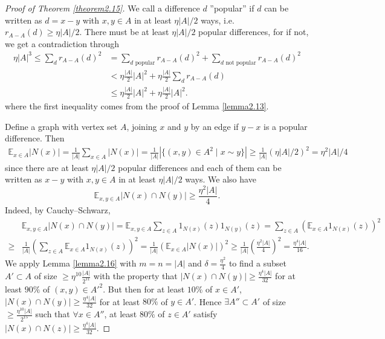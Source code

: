 \documentclass{article}
\theoremstyle{definition}
\begin{document}
\begin{proof}[Proof of Theorem \ref{theorem2.15}]
    We call a difference $d$ ''popular'' if $d$ can be written as $d = x-y$ with $x,y \in A$ in at least $\eta \left|A\right|/2$ ways, i.e. $r_{A-A}(d)\ge \eta\left|A\right|/2$. There must be at least $\eta \left|A\right|/2$ popular differences, for if not, we get a contradiction through
    \begin{align*}
        \eta \left|A\right|^3 \le \sum_{d}^{} r_{A-A}(d)^2 &= \sum_{d \text{ popular}}^{} r_{A-A}(d)^2 + \sum_{d \text{ not popular}}^{} r_{A-A}(d)^2 \\
        &< \eta \frac{\left|A\right|}{2}\left|A\right|^2 + \eta \frac{\left|A\right|}{2}\sum_{d }^{} r_{A-A}(d) \\
        &\le \eta \frac{\left|A\right|}{2}\left|A\right|^2 + \eta \frac{\left|A\right|}{2}\left|A\right|^2.
    \end{align*}
    where the first inequality comes from the proof of Lemma \ref{lemma2.13}.
    \vspace{1mm}
     
    Define a graph with vertex set $A$, joining $x$ and $y$ by an edge if $y-x$ is a popular difference. Then 
    \begin{align*}
        \mathbb{E}_{x \in A} \left|N(x)\right| = \frac{1}{\left|A\right|}\sum_{x \in A}^{} \left|N(x)\right| = \frac{1}{\left|A\right|}\left|\{(x,y)\in A^2 \mid x \sim y\}\right| \ge \frac{1}{\left|A\right|}(\eta \left|A\right|/2)^2 = \eta^2\left|A\right|/4
    \end{align*}
    since there are at least $\eta\left|A\right|/2$ popular differences and each of them can be written as $x-y$ with $x,y \in A$ in at least $\eta\left|A\right|/2$ ways.
    We also have $$\mathbb{E}_{x, y \in A}\left|N(x) \cap N(y)\right|\ge \frac{\eta^2\left|A\right|}{4}.$$ Indeed, by Cauchy--Schwarz,
    \begin{align*}
        &\mathbb{E}_{x,y \in A}\left|N(x) \cap N(y)\right| = \mathbb{E}_{x,y \in A}\sum_{z \in A}^{} 1_{N(x)}(z)1_{N(y)}(z) = \sum_{z \in A}^{} \left(\mathbb{E}_{x \in A}1_{N(x)}(z)\right)^2 \\
        \ge& \frac{1}{\left|A\right|} \left(\sum_{z \in A}^{} \mathbb{E}_{x \in A}1_{N(x)}(z)\right)^2 = \frac{1}{\left|A\right|}\left(\mathbb{E}_{x \in A}\left|N(x)\right|\right)^2 \ge \frac{1}{\left|A\right|} \left(\frac{\eta^2 \left|A\right|}{4}\right)^2 = \frac{\eta^4 \left|A\right|}{16}. 
    \end{align*}
    We apply Lemma \ref{lemma2.16} with $m=n=\left|A\right|$ and $\delta = \frac{\eta^2}{4}$ to find a subset $A' \subset A$ of size $\ge \eta^{10}\frac{\left|A\right|}{2^{11}}$ with the property that $\left|N(x) \cap N(y)\right| \ge \frac{\eta^4\left|A\right|}{32}$ for at least $90\%$ of $(x,y) \in A'^2$. But then for at least $10\%$ of $x \in A'$, $\left|N(x) \cap N(y)\right| \ge \frac{\eta^4 \left|A\right|}{32}$ for at least $80\%$ of $y \in A'$. Hence $\exists  A'' \subset A'$ of size $\ge \frac{\eta^{10}\left|A\right|}{2^{15}}$ such that $\forall x \in A''$, at least $80\%$ of $z \in A'$ satisfy $\left|N(x) \cap N(z)\right|\ge \frac{\eta^4\left|A\right|}{32}$. 
    \vspace{1mm}
     

\end{proof}
\end{document}
